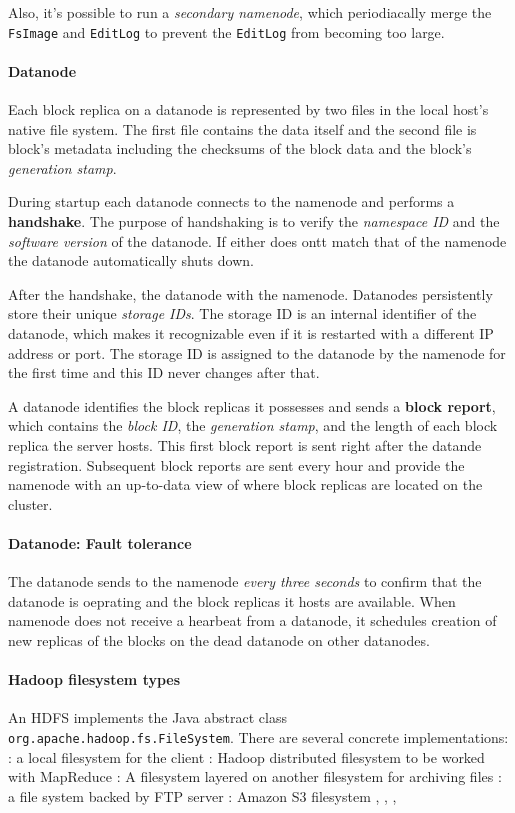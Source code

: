 \documentclass{memo}
\begin{document}
Also, it's possible to run a {\em secondary namenode}, which periodiacally
merge the {\tt FsImage} and {\tt EditLog} to prevent the {\tt EditLog} from
becoming too large. 

\paragraph{Datanode}
Each block replica on a datanode is represented by two files in the local
host's native file system. The first file contains the data itself and the
second file is block's metadata including the checksums of the block data and
the block's {\em generation stamp\/}. 

During startup each datanode connects to the namenode and performs a {\bf
  handshake\/}. The purpose of handshaking is to verify the {\em namespace
  ID\/} and the {\em software version\/} of the datanode. If either does ontt
match that of the namenode the datanode automatically shuts down.

After the handshake, the datanode  with the namenode. Datanodes
persistently store their unique {\em storage IDs\/}. The storage ID is an
internal identifier of the datanode, which makes it recognizable even if it is
restarted with a different IP address or port. The storage ID is assigned to
the datanode by the namenode for the first time and this ID never changes
after that.

A datanode identifies the block replicas it possesses and sends a {\bf block
  report}, which contains the {\em block ID\/}, the {\em generation stamp\/},
and the length of each block replica the server hosts. This first block report
is sent right after the datande registration. Subsequent block reports are
sent every hour and provide the namenode with an up-to-data view of where
block replicas are located on the cluster.

\paragraph{Datanode: Fault tolerance}
The datanode sends  to the namenode {\em every three seconds\/}
to confirm that the datanode is oeprating and the block replicas it hosts are
available. When namenode does not receive a hearbeat from a datanode, it
schedules creation of new replicas of the blocks on the dead datanode on other
datanodes. 




\paragraph{Hadoop filesystem types}
An HDFS implements the Java abstract class
\verb+org.apache.hadoop.fs.FileSystem+. There are several concrete
implementations:
\bit
\w {}: a local filesystem for the client
\w {}: Hadoop distributed filesystem to be worked with MapReduce
\w {}: A filesystem layered on another filesystem for archiving files
\w {}: a file system backed by FTP server
\w {}: Amazon S3 filesystem
\w {}, , ,
\eit
\end{document}
